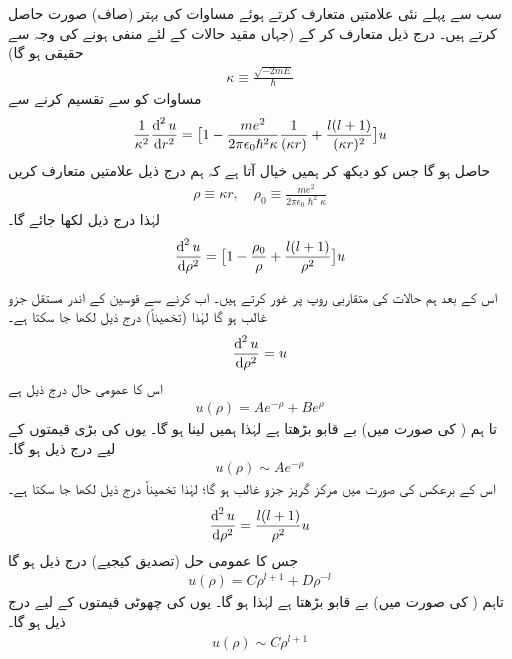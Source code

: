  سب سے پہلے نئی علامتیں متعارف کرتے ہوئے مساوات کی بہتر (صاف) صورت حاصل کرتے ہیں۔ درج ذیل متعارف کر کے (جہاں مقید حالات کے لئے  منفی ہونے کی وجہ سے   حقیقی ہو گا)
 \begin{align}\label{مساوات_ابعادی_متعارف_الف}
\kappa \equiv \frac{\sqrt{-2mE}}{\hslash} 
\end{align}
 مساوات  کو  سے تقسیم کرنے سے
\begin{align*}
\frac{1}{\kappa ^{2}}\frac{\dif^{\,2}{u}}{\dif{r^{2}}}=\big[1-\frac{me^{2}}{2\pi\epsilon_{0}\hslash^{2}\kappa }\frac{1}{(\kappa r)}+\frac{l(l+1)}{(\kappa r)^{2}}\big]u 
\end{align*}
حاصل ہو گا جس کو دیکھ کر ہمیں خیال آتا ہے کہ ہم درج ذیل علامتیں متعارف کریں 
\begin{align}\label{مساوات_ابعادی_متعارف_ب}
\rho\equiv \kappa r, \quad \rho_{0}\equiv\frac{me^{2}}{2\pi\epsilon_{0}\hslash^{2}\kappa } 
\end{align}
لہٰذا درج ذیل لکھا جائے گا۔
\begin{align}\label{مساوات_ابعادی_رداسی_کولمب_نئے_متغیرات}
\frac{\dif^{\,2}{u}}{\dif{\rho^{2}}}=\big[1-\frac{\rho_{0}}{\rho}+\frac{l(l+1)}{\rho^{2}}\big]u 
\end{align}

اس کے بعد ہم حالات کی متقاربی روپ پر غور کرتے ہیں۔ اب  کرنے سے قوسین کے اندر مستقل جزو غالب ہو گا لہٰذا (تخمیناً) درج ذیل لکھا جا سکتا ہے۔
\begin{align*}
\frac{\dif^{\,2}{u}}{\dif{\rho^{2}}}=u 
\end{align*}
اس کا عمومی حال درج ذیل ہے
\begin{align}\label{مساوات_ابعاد_عمومی_حل_بے_قابو}
u(\rho)=Ae^{-\rho}+Be^{\rho} 
\end{align}
تا ہم  ( کی صورت میں)  بے قابو بڑھتا ہے لہٰذا ہمیں  لینا ہو گا۔ یوں 
کی بڑی قیمتوں کے لیے درج  ذیل ہو گا۔
\begin{align}
u(\rho)\sim Ae^{-\rho} 
\end{align}
اس کے برعکس  کی صورت میں مرکز گریز جزو غالب ہو گا؛ لہٰذا تخمیناً  درج ذیل لکھا جا سکتا ہے۔ 
\begin{align*}
\frac{\dif^{\,2}{u}}{\dif{\rho^{2}}}=\frac{l(l+1)}{\rho^{2}}u 
\end{align*}
 جس کا عمومی حل (تصدیق کیجیے) درج ذیل ہو گا
 \begin{align*}
u(\rho)=C\rho^{l+1}+D\rho^{-l} 
\end{align*}
 تاہم  (  کی صورت میں)    بے قابو بڑھتا ہے لہٰذا   ہو گا۔ یوں    کی چھوٹی قیمتوں کے لیے درج ذیل ہو گا۔
 \begin{align}\label{مساوات_ابعادی_ہائیڈروجن_مبدا_قریب}
u(\rho)\sim C\rho^{l+1} 
\end{align}

